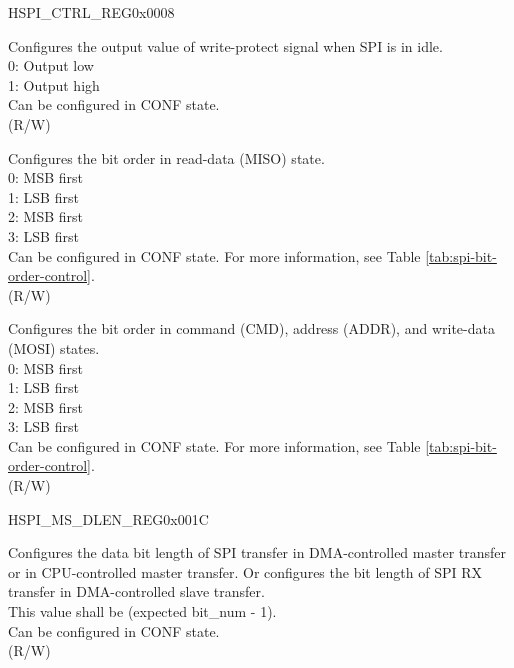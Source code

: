 \addtocounter{Regfloat}{-1}
\begin{register}{H}{SPI\_CTRL\_REG}{0x0008}
\begin{regdesc}\begin{reglist}
\item [Continued from the previous page...]
\label{fielddesc:SPIWPPOL}\item [SPI\_WP\_POL] Configures the output value of write-protect signal when SPI is in idle. \\
0: Output low \\
1: Output high \\
Can be configured in CONF state.\\
(R/W)
\label{fielddesc:SPIRDBITORDER}\item [SPI\_RD\_BIT\_ORDER] Configures the bit order in read-data (MISO) state. \\
0: MSB first \\
1: LSB first \\
2: MSB first \\
3: LSB first \\
Can be configured in CONF state. For more information, see Table \ref{tab:spi-bit-order-control}.\\
(R/W)
\label{fielddesc:SPIWRBITORDER}\item [SPI\_WR\_BIT\_ORDER] Configures the bit order in command (CMD), address (ADDR), and write-data (MOSI) states. \\
0: MSB first \\
1: LSB first \\
2: MSB first \\
3: LSB first \\
Can be configured in CONF state. For more information, see Table \ref{tab:spi-bit-order-control}.\\
(R/W)
\end{reglist}\end{regdesc}
\end{register}


\begin{register}{H}{SPI\_MS\_DLEN\_REG}{0x001C}\label{regdesc:SPIMSDLENREG}
%
%
\regnewline%
\begin{regdesc}\begin{reglist}
\label{fielddesc:SPIMSDATABITLEN}\item [SPI\_MS\_DATA\_BITLEN] Configures the data bit length of SPI transfer in DMA-controlled master transfer or in CPU-controlled master transfer. Or configures the bit length of SPI RX transfer in DMA-controlled slave transfer.\\
This value shall be (expected bit\_num - 1). \\
Can be configured in CONF state. \\
(R/W)
\end{reglist}\end{regdesc}
\end{register}


